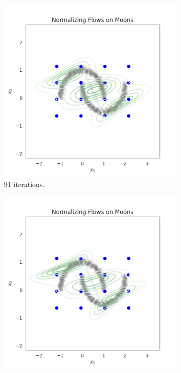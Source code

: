 \documentclass[shortabstract]{iithesis}
\begin{document}
\begin{figure}
    \begin{subfigure}{0.32\textwidth}
    \includegraphics[scale=0.35]{flow_on_moons_9_penalty=0_grid.png}
    \caption{ 91 iterations.}
    \end{subfigure}
    \begin{subfigure}{0.32\textwidth}
    \includegraphics[scale=0.35]{flow_on_moons_10_penalty=0_grid.png}

\end{subfigure}
\end{figure}
\end{document}
